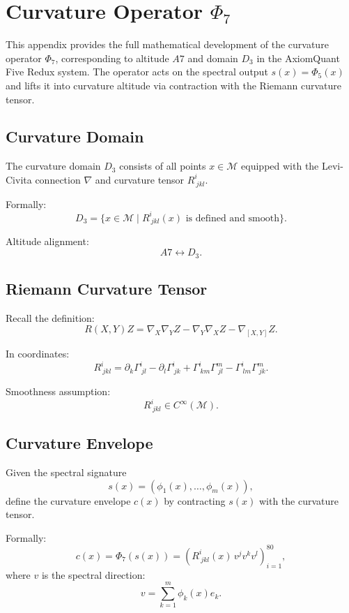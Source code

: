 \section{Curvature Operator \texorpdfstring{$\Phi_7$}{Phi7}}
\label{sec:curvature}

This appendix provides the full mathematical development of the curvature
operator $\Phi_7$, corresponding to altitude $A7$ and domain $D_3$ in the
AxiomQuant Five Redux system. The operator acts on the spectral output
$s(x) = \Phi_5(x)$ and lifts it into curvature altitude via contraction with
the Riemann curvature tensor.

\subsection{Curvature Domain}

The curvature domain $D_3$ consists of all points $x \in \mathcal{M}$ equipped
with the Levi-Civita connection $\nabla$ and curvature tensor $R^i_{\ jkl}$.

Formally:
\[
D_3 = \{ x \in \mathcal{M} \mid R^i_{\ jkl}(x) \text{ is defined and smooth} \}.
\]

Altitude alignment:
\[
A7 \leftrightarrow D_3.
\]

\subsection{Riemann Curvature Tensor}

Recall the definition:
\[
R(X,Y)Z = \nabla_X \nabla_Y Z - \nabla_Y \nabla_X Z - \nabla_{[X,Y]} Z.
\]

In coordinates:
\[
R^i_{\ jkl}
= \partial_k \Gamma^i_{\ jl}
- \partial_l \Gamma^i_{\ jk}
+ \Gamma^i_{\ km}\Gamma^m_{\ jl}
- \Gamma^i_{\ lm}\Gamma^m_{\ jk}.
\]

Smoothness assumption:
\[
R^i_{\ jkl} \in C^\infty(\mathcal{M}).
\]

\subsection{Curvature Envelope}

Given the spectral signature
\[
s(x) = (\phi_1(x), \dots, \phi_m(x)),
\]
define the curvature envelope $c(x)$ by contracting $s(x)$ with the curvature
tensor.

Formally:
\[
c(x) = \Phi_7(s(x))
= \left( R^i_{\ jkl}(x) \, v^j v^k v^l \right)_{i=1}^{80},
\]
where $v$ is the spectral direction:
\[
v = \sum_{k=1}^m \phi_k(x) e_k.
\]

